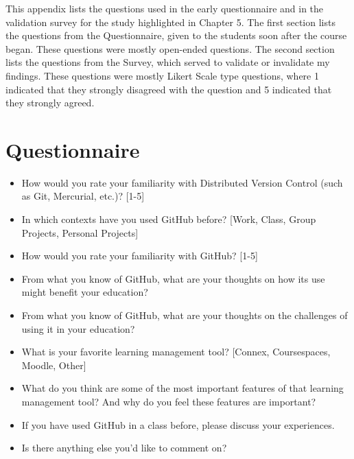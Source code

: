 This appendix lists the questions used in the early questionnaire and in the validation survey for the study highlighted in Chapter 5. The first section lists the questions from the Questionnaire, given to the students soon after the course began. These questions were mostly open-ended questions. The second section lists the questions from the Survey, which served to validate or invalidate my findings. These questions were mostly Likert Scale type questions, where 1 indicated that they strongly disagreed with the question and 5 indicated that they strongly agreed.

\section{Questionnaire}
\begin{itemize}
    \item How would you rate your familiarity with Distributed Version Control (such as Git, Mercurial, etc.)? [1-5]
    \item In which contexts have you used GitHub before? [Work, Class, Group Projects, Personal Projects]
    \item How would you rate your familiarity with GitHub? [1-5]
    \item From what you know of GitHub, what are your thoughts on how its use might benefit your education?
    \item From what you know of GitHub, what are your thoughts on the challenges of using it in your education?
    \item What is your favorite learning management tool? [Connex, Coursespaces, Moodle, Other]
    \item What do you think are some of the most important features of that learning management tool? And why do you feel these features are important?
    \item If you have used GitHub in a class before, please discuss your experiences.
    \item Is there anything else you'd like to comment on?
\end{itemize}

